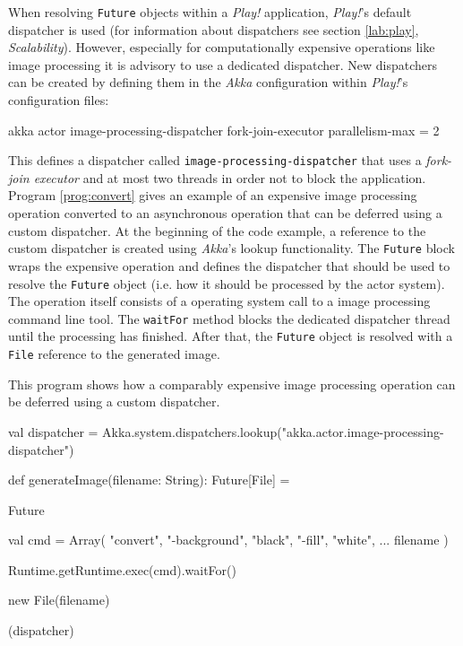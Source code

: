 When resolving \texttt{Future} objects within a \textit{Play!} application, \textit{Play!}'s default dispatcher is used (for information about dispatchers see section \ref{lab:play}, \textit{Scalability}). However, especially for computationally expensive operations like image processing it is advisory to use a dedicated dispatcher. New dispatchers can be created by defining them in the \textit{Akka} configuration within \textit{Play!}'s configuration files:
\begin{JavaCode}
akka {
    actor {
        image-processing-dispatcher {
            fork-join-executor {
                parallelism-max = 2
            }
        }
    }
}
\end{JavaCode}
This defines a dispatcher called \texttt{image-processing-dispatcher} that uses a \textit{fork-join executor} and at most two threads in order not to block the application. Program \ref{prog:convert} gives an example of an expensive image processing operation converted to an asynchronous operation that can be deferred using a custom dispatcher. At the beginning of the code example, a reference to the custom dispatcher is created using \textit{Akka}'s lookup functionality. The \texttt{Future} block wraps the expensive operation and defines the dispatcher that should be used to resolve the \texttt{Future} object (i.e. how it should be processed by the actor system). The operation itself consists of a operating system call to a image processing command line tool. The \texttt{waitFor} method blocks the dedicated dispatcher thread until the processing has finished. After that, the \texttt{Future} object is resolved with a \texttt{File} reference to the generated image.

\begin{program}
  \caption{This program shows how a comparably expensive image processing operation can be deferred using a custom dispatcher.}
  \label{prog:convert}
  \begin{JavaCode}
val dispatcher = Akka.system.dispatchers.lookup("akka.actor.image-processing-dispatcher")

def generateImage(filename: String): Future[File] = {

    Future {

        val cmd = Array(
            "convert",
            "-background", "black",
            "-fill", "white",
            ...
            filename
        )

        Runtime.getRuntime.exec(cmd).waitFor()

        new File(filename)
    
    } (dispatcher)
    
}
  \end{JavaCode}
\end{program}


